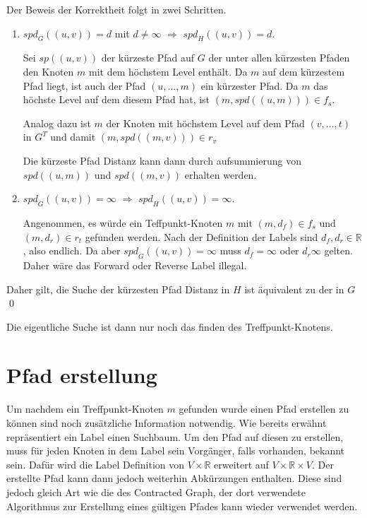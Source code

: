 \begin{beweis}\label{hl:proof:correct}
    Der Beweis der Korrektheit folgt in zwei Schritten.

    \begin{enumerate}
        \item
              ${spd}_G ((u, v)) = d$ mit $d \neq \infty$ $\Rightarrow$ ${spd}_H((u, v)) = d$.

              Sei ${sp}((u, v))$ der kürzeste Pfad auf $G$ der unter allen kürzesten Pfaden den Knoten $m$ mit dem höchstem Level enthält.
              Da $m$ auf dem kürzestem Pfad liegt, ist auch der Pfad $(u, \dotsc, m)$ ein kürzester Pfad.
              Da $m$ das höchste Level auf dem diesem Pfad hat, ist $(m, {spd}((u, m))) \in f_s$.

              Analog dazu ist $m$ der Knoten mit höchstem Level auf dem Pfad $(v, \dotsc, t)$ in $G^T$ und damit $(m, {spd}((m, v))) \in r_v$

              Die kürzeste Pfad Distanz kann dann durch aufsummierung von ${spd}((u, m))$ und ${spd}((m, v))$ erhalten werden.

        \item
              ${spd}_G ((u, v)) = \infty$ $\Rightarrow$ ${spd}_H((u, v)) = \infty$.

              Angenommen, es würde ein Teffpunkt-Knoten $m$ mit $(m, d_f) \in f_s$ und $(m, d_r) \in r_t$ gefunden werden.
              Nach der Definition der Labels sind $d_f, d_r \in \mathbb{R}$, also endlich.
              Da aber ${spd}_G ((u, v)) = \infty$ muss $d_f = \infty$ oder $d_r \infty$ gelten.
              Daher wäre das Forward oder Reverse Label illegal.
    \end{enumerate}

    Daher gilt, die Suche der kürzesten Pfad Distanz in $H$ ist äquivalent zu der in $G$
    \qed
\end{beweis}

Die eigentliche Suche ist dann nur noch das finden des Treffpunkt-Knotens.


\section{Pfad erstellung}

Um nachdem ein Treffpunkt-Knoten $m$ gefunden wurde einen Pfad erstellen zu können sind noch zusätzliche Information notwendig.
Wie bereits erwähnt repräsentiert ein Label einen Suchbaum.
Um den Pfad auf diesen zu erstellen, muss für jeden Knoten in dem Label sein Vorgänger, falls vorhanden, bekannt sein.
Dafür wird die Label Definition von $V \times \mathbb{R}$ erweitert auf $V \times \mathbb{R} \times V$.
Der erstellte Pfad kann dann jedoch weiterhin Abkürzungen enthalten.
Diese sind jedoch gleich Art wie die des Contracted Graph, der dort verwendete Algorithmus zur Erstellung eines gültigen Pfades kann wieder verwendet werden.


